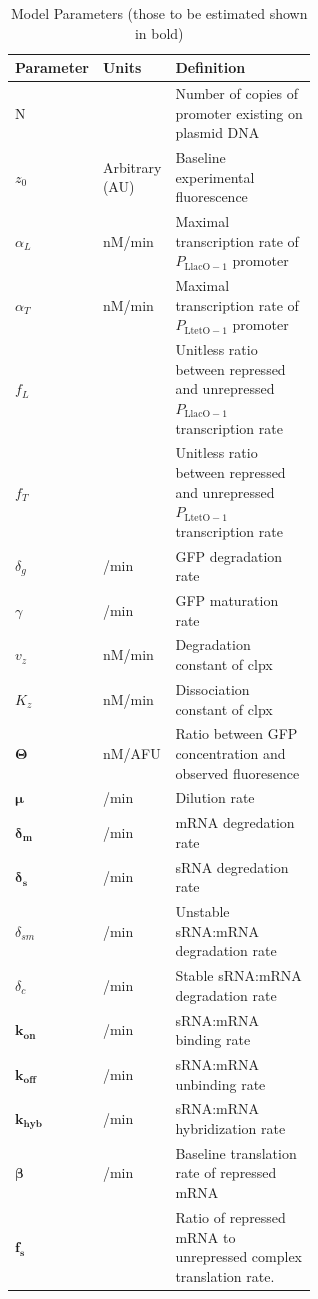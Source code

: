 \documentclass[10pt,journal]{./IEEE_latex_class/IEEEtran}
\begin{document}
\begin{table}[h]
\renewcommand{\arraystretch}{1.3}
\caption{Model Parameters (those to be estimated shown in bold)}
\label{ModelParameters}
\centering
\begin{tabular}{| l | l | p{0.6\linewidth} |}
\hline \textbf{Parameter} &  \textbf{Units} & \textbf{Definition}  \\
\hline \hline N & & Number of copies of promoter existing on plasmid DNA  \\
\hline $z_{0}$ &  Arbitrary (AU) & Baseline experimental fluorescence  \\
\hline $\alpha_{L}$ & nM/min & Maximal transcription rate of $P_\mathrm{LlacO-1}$ promoter\\
\hline $\alpha_{T}$  &  nM/min  & Maximal transcription rate of $P_{\mathrm{LtetO-1}}$ promoter \\
\hline $f_{L}$ &  & Unitless ratio between repressed and unrepressed $P_\mathrm{LlacO-1}$ transcription rate   \\ 
\hline $f_{T}$ &  & Unitless ratio between repressed and unrepressed $P_{\mathrm{LtetO-1}}$ transcription rate  \\
\hline $\delta_{g}$  & /min  & GFP degradation rate  \\
\hline $\gamma$ &  /min & GFP maturation rate  \\
\hline $v_{z}$ & nM/min & Degradation constant of clpx  \\
\hline $K_{z}$   &   nM/min & Dissociation constant of clpx  \\
\hline $\boldsymbol{\Theta}$  &   nM/AFU & Ratio between GFP concentration and observed fluoresence  \\
\hline $\boldsymbol{\mu}$ &  /min & Dilution rate  \\
\hline $\boldsymbol{\delta_{m}}$ &  /min & mRNA degredation rate  \\
\hline $\boldsymbol{\delta_{s}}$ &  /min & sRNA degredation rate  \\
\hline $\delta_{sm}$ &  /min & Unstable sRNA:mRNA degradation rate  \\
\hline $\delta_{c}$ &  /min & Stable sRNA:mRNA degradation rate  \\
\hline $\boldsymbol{k_{on}}$ &   /min & sRNA:mRNA binding rate \\
\hline $\boldsymbol{k_{off}}$ &  /min & sRNA:mRNA unbinding rate \\
\hline $\boldsymbol{k_{hyb}}$ &  /min & sRNA:mRNA hybridization rate \\
\hline $\boldsymbol{\beta}$ &   /min & Baseline translation rate of repressed mRNA \\
\hline $\boldsymbol{f_{s}}$ & & Ratio of repressed mRNA to unrepressed complex translation rate. \\
\hline
\end{tabular}
\end{table}
\end{document}
